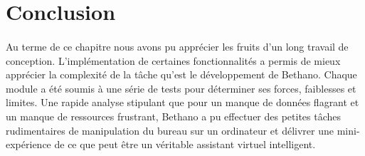 \section{Conclusion}
\paragraph{}
Au terme de ce chapitre nous avons pu apprécier les fruits d'un long travail de conception. L'implémentation de certaines fonctionnalités a permis de mieux apprécier la complexité de la tâche qu'est le développement de Bethano. Chaque module a été soumis à une série de tests pour déterminer ses forces, faiblesses et limites. Une rapide analyse stipulant que pour un manque de données flagrant et un manque de ressources frustrant, Bethano a pu effectuer des petites tâches rudimentaires de manipulation du bureau sur un ordinateur et délivrer une mini-expérience de ce que peut être un véritable assistant virtuel intelligent.

